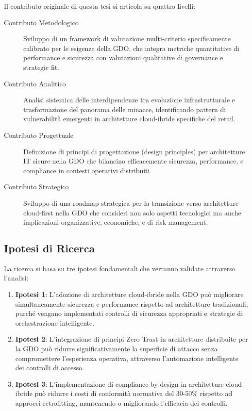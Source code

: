 \documentclass[12pt,a4paper,oneside]{book}
\begin{document}
Il contributo originale di questa tesi si articola su quattro livelli:
\begin{description}
    \item[Contributo Metodologico] Sviluppo di un framework di valutazione multi-criterio specificamente calibrato per le esigenze della GDO, che integra metriche quantitative di performance e sicurezza con valutazioni qualitative di governance e strategic fit.
    \item[Contributo Analitico] Analisi sistemica delle interdipendenze tra evoluzione infrastrutturale e trasformazione del panorama delle minacce, identificando pattern di vulnerabilità emergenti in architetture cloud-ibride specifiche del retail.
    \item[Contributo Progettuale] Definizione di principi di progettazione (design principles) per architetture IT sicure nella GDO che bilancino efficacemente sicurezza, performance, e compliance in contesti operativi distribuiti.
    \item[Contributo Strategico] Sviluppo di una roadmap strategica per la transizione verso architetture cloud-first nella GDO che consideri non solo aspetti tecnologici ma anche implicazioni organizzative, economiche, e di risk management.
\end{description}

\subsection{Ipotesi di Ricerca}
\label{ssec:ipotesi_ricerca}

La ricerca si basa su tre ipotesi fondamentali che verranno validate attraverso l'analisi:
\begin{enumerate}
    \item \textbf{Ipotesi 1}: L'adozione di architetture cloud-ibride nella GDO può migliorare simultaneamente sicurezza e performance rispetto ad architetture tradizionali, purché vengano implementati controlli di sicurezza appropriati e strategie di orchestrazione intelligente.
    \item \textbf{Ipotesi 2}: L'integrazione di principi Zero Trust in architetture distribuite per la GDO può ridurre significativamente la superficie di attacco senza compromettere l'esperienza operativa, attraverso l'automazione intelligente dei controlli di accesso.
    \item \textbf{Ipotesi 3}: L'implementazione di compliance-by-design in architetture cloud-ibride può ridurre i costi di conformità normativa del 30-50\% rispetto ad approcci retrofitting, mantenendo o migliorando l'efficacia dei controlli.
\end{enumerate}
\end{document}
